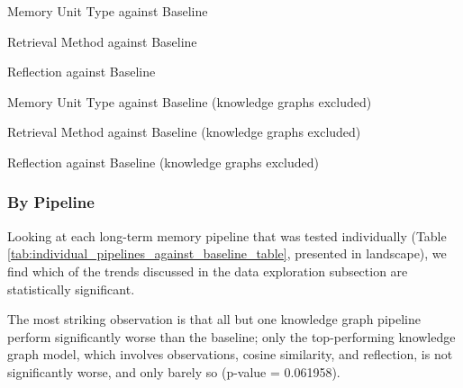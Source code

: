 \begin{table}[p]
\centering
\tiny

\caption{Memory Unit Type against Baseline}
\label{tab:memory_unit_type_against_baseline_table}
\end{table}

\begin{table}[p]
\centering
\tiny

\caption{Retrieval Method against Baseline}
\label{tab:retrieval_method_against_baseline_table}
\end{table}

\begin{table}[p]
\centering
\tiny

\caption{Reflection against Baseline}
\label{tab:reflection_against_baseline_table}
\end{table}

\begin{table}[p]
\centering
\tiny

\caption{Memory Unit Type against Baseline (knowledge graphs excluded)}
\label{tab:memory_unit_type_against_baseline_table_no_kg}
\end{table}

\begin{table}[p]
\centering
\tiny

\caption{Retrieval Method against Baseline (knowledge graphs excluded)}
\label{tab:retrieval_method_against_baseline_table_no_kg}
\end{table}

\begin{table}[p]
\centering
\tiny

\caption{Reflection against Baseline (knowledge graphs excluded)}
\label{tab:reflection_against_baseline_table_no_kg}
\end{table}


\subsubsection{By Pipeline}

Looking at each long-term memory pipeline that was tested individually (Table \ref{tab:individual_pipelines_against_baseline_table}, presented in landscape), we find which of the trends discussed in the data exploration subsection are statistically significant. 

The most striking observation is that all but one knowledge graph pipeline perform significantly worse than the baseline; only the top-performing knowledge graph model, which involves observations, cosine similarity, and reflection, is not significantly worse, and only barely so (p-value = 0.061958).

